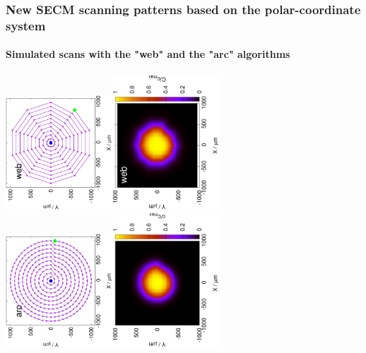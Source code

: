 \documentclass{beamer}
\begin{document}
\begin{frame}
	\frametitle{New SECM scanning patterns based on the polar-coordinate system}	
	\framesubtitle{Simulated scans with the "web" and the "arc" algorithms}
	\includegraphics[width=0.3\textwidth, angle=-90]{web_pattern.eps}\includegraphics[width=0.3\textwidth, angle=-90]{web_sim.eps}\\
		\includegraphics[width=0.3\textwidth, angle=-90]{arc_pattern.eps}\includegraphics[width=0.3\textwidth, angle=-90]{arc_sim.eps}
	\vfill
\end{frame}
\end{document}
